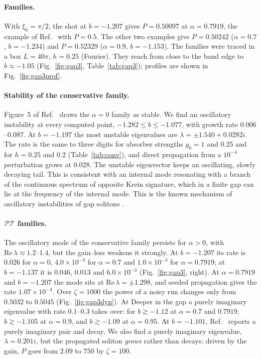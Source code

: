 \documentclass[pra,twocolumn,superscriptaddress,longbibliography]{revtex4-2}
\newif\ifshowtodos
\newcommand{\todo}[1]{\ifshowtodos\textcolor{red}{[TODO: #1]}\fi}
\newcommand{\PT}{\mathcal{PT}}
\newcommand{\Rea}{\mathrm{Re}\,}
\begin{document}
\paragraph*{Families.}
With $\xi_0=\pi/2$, the shot at $b=-1.207$ gives $P=0.50097$ at $\alpha=0.7919$, the example of
Ref.~\cite{MKM2013} with $P=0.5$. The other two examples give $P=0.50242$ ($\alpha=0.7$,
$b=-1.234$) and $P=0.52329$ ($\alpha=0.9$, $b=-1.153$). The families were traced in a box $L=40\pi$, $h=0.25$ (Fourier). They reach from close to the band edge to $b\approx-1.05$ (Fig.~\ref{fig:gap3}, Table~\ref{tab:gap3}); profiles are shown in
Fig.~\ref{fig:gap3prof}.

\paragraph*{Stability of the conservative family.}
Figure~5 of Ref.~\cite{MKM2013} draws the $\alpha=0$ family as stable. We find an oscillatory
instability at every computed point, $-1.282\le b\le-1.077$, with growth rate $0.006$--$0.087$.
At $b=-1.197$ the most unstable eigenvalues are $\lambda = \pm1.540 + 0.0282i$. The rate is the
same to three digits for absorber strengths $g_0=1$ and $0.25$ and for $h=0.25$ and $0.2$
(Table~\ref{tab:conv}), and direct propagation from a $10^{-4}$ perturbation grows at $0.028$. The unstable eigenvector keeps an oscillating, slowly decaying tail. This is consistent with an
internal mode resonating with a branch of the continuous spectrum of opposite Krein signature,
which in a finite gap can lie at the frequency of the internal mode. This is the known mechanism
of oscillatory instabilities of gap solitons \cite{Barashenkov1998,Pelinovsky2004}. \todo{Krein-signature computation to confirm the
mechanism (PLAN.md, C3).}

\paragraph*{$\PT$ families.}
The oscillatory mode of the conservative family persists for $\alpha>0$, with
$\Rea\lambda\approx1.2$--$1.4$, but the gain--loss weakens it strongly. At $b=-1.207$ its rate is
$0.026$ for $\alpha=0$, $4.0\times10^{-3}$ for $\alpha=0.7$ and $1.0\times10^{-3}$ for
$\alpha=0.7919$; at $b=-1.137$ it is $0.046$, $0.013$ and $6.0\times10^{-3}$
(Fig.~\ref{fig:gap3}, right). At $\alpha=0.7919$ and $b=-1.207$ the mode sits at
$\Rea\lambda=\pm1.298$, and seeded propagation gives the rate $1.07\times10^{-3}$. Over $\zeta=1000$ the
power of a noisy run changes only from $0.5032$ to $0.5045$ (Fig.~\ref{fig:gap3dyn}). At
Deeper in the gap a purely imaginary eigenvalue with rate $0.1$--$0.3$ takes over: for
$b\gtrsim-1.12$ at $\alpha=0.7$ and $0.7919$, $b\gtrsim-1.105$ at $\alpha=0.9$, and
$b\gtrsim-1.09$ at $\alpha=0.95$. At $b=-1.101$, Ref.~\cite{MKM2013} reports a purely imaginary pair
and decay. We also find a purely imaginary eigenvalue, $\lambda=0.201i$, but the propagated soliton
\emph{grows} rather than decays: driven by the gain, $P$ goes from $2.09$ to $750$ by $\zeta=100$.
\end{document}
